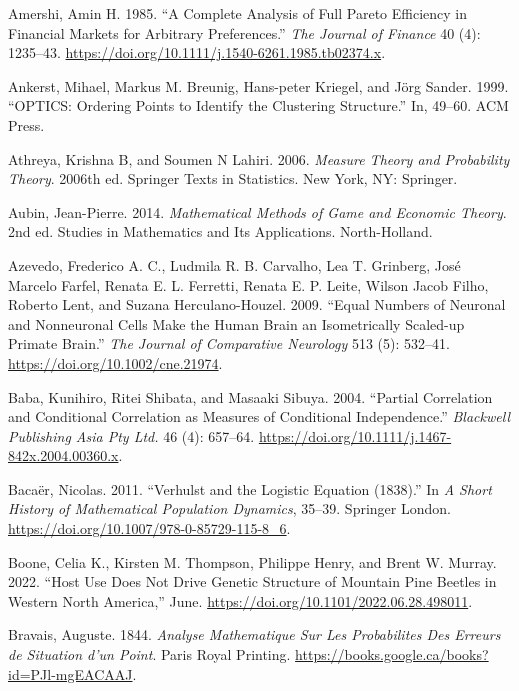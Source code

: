 \documentclass[
  letterpaper,
  DIV=11,
  numbers=noendperiod]{scrreprt}
\newlength{\cslhangindent}
\newenvironment{CSLReferences}[2] %
 {\begin{list}{}{%
  \setlength{\itemindent}{0pt}
  \setlength{\leftmargin}{0pt}
  \setlength{\parsep}{0pt}
  \ifodd #1
   \setlength{\leftmargin}{\cslhangindent}
   \setlength{\itemindent}{-1\cslhangindent}
  \fi
  \setlength{\itemsep}{#2\baselineskip}}}
 {\end{list}}
\begin{document}
\label{refs}
\begin{CSLReferences}{1}{0}
Amershi, Amin H. 1985. {``A Complete Analysis of Full Pareto Efficiency
in Financial Markets for Arbitrary Preferences.''} \emph{The Journal of
Finance} 40 (4): 1235--43.
\url{https://doi.org/10.1111/j.1540-6261.1985.tb02374.x}.

Ankerst, Mihael, Markus M. Breunig, Hans-peter Kriegel, and Jörg Sander.
1999. {``OPTICS: Ordering Points to Identify the Clustering
Structure.''} In, 49--60. ACM Press.

Athreya, Krishna B, and Soumen N Lahiri. 2006. \emph{Measure Theory and
Probability Theory}. 2006th ed. Springer Texts in Statistics. New York,
NY: Springer.

Aubin, Jean-Pierre. 2014. \emph{Mathematical Methods of Game and
Economic Theory}. 2nd ed. Studies in Mathematics and Its Applications.
North-Holland.

Azevedo, Frederico A. C., Ludmila R. B. Carvalho, Lea T. Grinberg, José
Marcelo Farfel, Renata E. L. Ferretti, Renata E. P. Leite, Wilson Jacob
Filho, Roberto Lent, and Suzana Herculano-Houzel. 2009. {``Equal Numbers
of Neuronal and Nonneuronal Cells Make the Human Brain an Isometrically
Scaled-up Primate Brain.''} \emph{The Journal of Comparative Neurology}
513 (5): 532--41. \url{https://doi.org/10.1002/cne.21974}.

Baba, Kunihiro, Ritei Shibata, and Masaaki Sibuya. 2004. {``Partial
Correlation and Conditional Correlation as Measures of Conditional
Independence.''} \emph{Blackwell Publishing Asia Pty Ltd.} 46 (4):
657--64. \url{https://doi.org/10.1111/j.1467-842x.2004.00360.x}.

Bacaër, Nicolas. 2011. {``Verhulst and the Logistic Equation (1838).''}
In \emph{A Short History of Mathematical Population Dynamics}, 35--39.
Springer London. \url{https://doi.org/10.1007/978-0-85729-115-8_6}.

Boone, Celia K., Kirsten M. Thompson, Philippe Henry, and Brent W.
Murray. 2022. {``Host Use Does Not Drive Genetic Structure of Mountain
Pine Beetles in Western North America,''} June.
\url{https://doi.org/10.1101/2022.06.28.498011}.

Bravais, Auguste. 1844. \emph{Analyse Mathematique Sur Les Probabilites
Des Erreurs de Situation d'un Point}. Paris Royal Printing.
\url{https://books.google.ca/books?id=PJl-mgEACAAJ}.


\end{CSLReferences}
\end{document}
